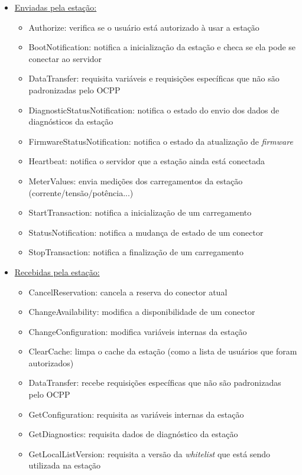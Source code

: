     \begin{itemize}
      \item \underline{Enviadas pela estação:}
      \begin{itemize}
        \item Authorize: verifica se o usuário está autorizado à usar a estação
        \item BootNotification: notifica a inicialização da estação e checa se ela pode se conectar ao servidor
        \item DataTransfer: requisita variáveis e requisições específicas que não são padronizadas pelo OCPP
        \item DiagnosticStatusNotification: notifica o estado do envio dos dados de diagnósticos da estação
        \item FirmwareStatusNotification: notifica o estado da atualização de \textit{firmware}
        \item Heartbeat: notifica o servidor que a estação ainda está conectada
        \item MeterValues: envia medições dos carregamentos da estação (corrente/tensão/potência...)
        \item StartTransaction: notifica a inicialização de um carregamento
        \item StatusNotification: notifica a mudança de estado de um conector
        \item StopTransaction: notifica a finalização de um carregamento
      \end{itemize}
      \item \underline{Recebidas pela estação:}
      \begin{itemize}
        \item CancelReservation: cancela a reserva do conector atual
        \item ChangeAvailability: modifica a disponibilidade de um conector
        \item ChangeConfiguration: modifica variáveis internas da estação
        \item ClearCache: limpa o cache da estação (como a lista de usuários que foram autorizados)
        \item DataTransfer: recebe requisições específicas que não são padronizadas pelo OCPP
        \item GetConfiguration: requisita as variáveis internas da estação
        \item GetDiagnostics: requisita dados de diagnóstico da estação
        \item GetLocalListVersion: requisita a versão da \textit{whitelist} que está sendo utilizada na estação

\end{itemize}
\end{itemize}
